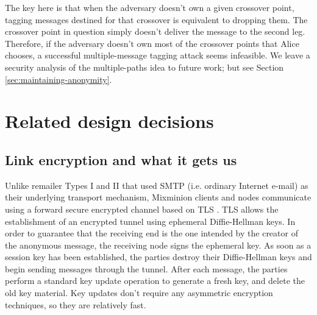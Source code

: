 \documentclass[11pt]{IEEEtran}
\begin{document}
The key here is that when the adversary doesn't own a given crossover
point, tagging messages destined for that crossover is equivalent to
dropping them.  The crossover point in question simply doesn't deliver
the message to the second leg. Therefore, if the adversary doesn't own
most of the crossover points that Alice chooses, a successful
multiple-message tagging attack seems infeasible.  We leave a security
analysis of the multiple-paths idea to future work; but see
Section \ref{sec:maintaining-anonymity}.

\section{Related design decisions}


\subsection{Link encryption and what it gets us}
\label{subsec:link-encrypt}

Unlike remailer Types I and II that used SMTP \cite{SMTP} (i.e. ordinary
Internet e-mail) as their underlying transport mechanism, Mixminion
clients and nodes communicate using a forward secure encrypted channel
based on TLS \cite{TLS}.  
TLS allows the establishment of an encrypted tunnel using ephemeral
Diffie-Hellman keys. In order to guarantee that the receiving end is
the one intended by the creator of the anonymous message, the
receiving node signs the ephemeral key. As soon as a session key
has been established, the parties destroy their Diffie-Hellman keys
and begin sending messages through the tunnel. After each message, the
parties perform a standard key update operation to generate a fresh
key, and delete the old key material.  Key updates don't require any
asymmetric encryption techniques, so they are relatively fast.

%
\end{document}
